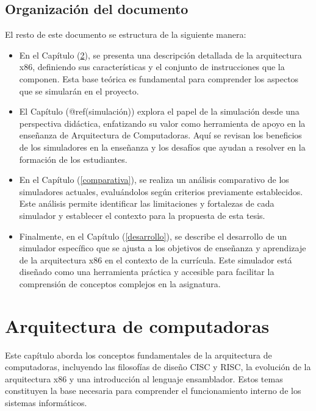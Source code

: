 \documentclass[12pt,oneside]{templates/unerthesis}
\begin{document}
\hypertarget{organizaciuxf3n-del-documento}{%
\section{Organización del documento}\label{organizaciuxf3n-del-documento}}

El resto de este documento se estructura de la siguiente manera:

\begin{itemize}
\item
  En el Capítulo (\ref{arquitectura}), se presenta una descripción detallada de la arquitectura x86, definiendo sus características y el conjunto de instrucciones que la componen. Esta base teórica es fundamental para comprender los aspectos que se simularán en el proyecto.
\item
  El Capítulo (@ref(simulación)) explora el papel de la simulación desde una perspectiva didáctica, enfatizando su valor como herramienta de apoyo en la enseñanza de Arquitectura de Computadoras. Aquí se revisan los beneficios de los simuladores en la enseñanza y los desafíos que ayudan a resolver en la formación de los estudiantes.
\item
  En el Capítulo (\ref{comparativa}), se realiza un análisis comparativo de los simuladores actuales, evaluándolos según criterios previamente establecidos. Este análisis permite identificar las limitaciones y fortalezas de cada simulador y establecer el contexto para la propuesta de esta tesis.
\item
  Finalmente, en el Capítulo (\ref{desarrollo}), se describe el desarrollo de un simulador específico que se ajusta a los objetivos de enseñanza y aprendizaje de la arquitectura x86 en el contexto de la currícula. Este simulador está diseñado como una herramienta práctica y accesible para facilitar la comprensión de conceptos complejos en la asignatura.
\end{itemize}

\hypertarget{arquitectura}{%
\chapter{Arquitectura de computadoras}\label{arquitectura}}

Este capítulo aborda los conceptos fundamentales de la arquitectura de computadoras, incluyendo las filosofías de diseño CISC y RISC, la evolución de la arquitectura x86 y una introducción al lenguaje ensamblador. Estos temas constituyen la base necesaria para comprender el funcionamiento interno de los sistemas informáticos.
\end{document}
